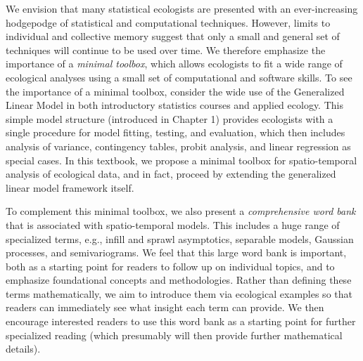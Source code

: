 We envision that many statistical ecologists are presented with an ever-increasing hodgepodge of statistical and computational techniques.  However, limits to individual and collective memory suggest that only a small and general set of techniques will continue to be used over time.  We therefore emphasize the importance of a \textit{minimal toolbox}, which allows ecologists to fit a wide range of ecological analyses using a small set of computational and software skills.  To see the importance of a minimal toolbox, consider the wide use of the Generalized Linear Model \cite{nelder_generalized_1972} in both introductory statistics courses and applied ecology.  This simple model structure (introduced in Chapter 1) provides ecologists with a single procedure for model fitting, testing, and evaluation, which then includes analysis of variance, contingency tables, probit analysis, and linear regression as special cases.  In this textbook, we propose a minimal toolbox for spatio-temporal analysis of ecological data, and in fact, proceed by extending the generalized linear model framework itself.    

To complement this minimal toolbox, we also present a \textit{comprehensive word bank} that is associated with spatio-temporal models.  This includes a huge range of specialized terms, e.g., infill and sprawl asymptotics, separable models, Gaussian processes, and semivariograms.  We feel that this large word bank is important, both as a starting point for readers to follow up on individual topics, and to emphasize foundational concepts and methodologies.  Rather than defining these terms mathematically, we aim to introduce them via ecological examples so that readers can immediately see what insight each term can provide.  We then encourage interested readers to use this word bank as a starting point for further specialized reading (which presumably will then provide further mathematical details).  

